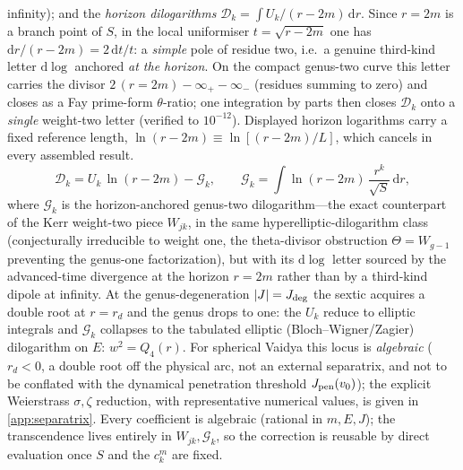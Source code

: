 \documentclass[12pt]{iopart}
\newcommand{\Jpen}{J_{\rm pen}}
\newcommand{\dd}{\mathrm{d}}
\begin{document}
infinity); and
the \emph{horizon dilogarithms} $\mathcal{D}_k=\int U_k/(r-2m)\,\dd r$. Since $r=2m$
is a branch point of $S$, in the local uniformiser $t=\sqrt{r-2m}$ one has
$\dd r/(r-2m)=2\,\dd t/t$: a \emph{simple} pole of residue two, i.e.\ a genuine
third-kind letter $\dd\log$ anchored \emph{at the horizon}. On the compact
genus-two curve this letter carries the divisor $2\,(r{=}2m)-\infty_+-\infty_-$ (residues
summing to zero) and closes as a Fay prime-form $\theta$-ratio; one integration by parts
then closes $\mathcal{D}_k$ onto a \emph{single} weight-two letter (verified to
$10^{-12}$). Displayed horizon logarithms carry a fixed reference length,
$\ln(r-2m)\equiv\ln[(r-2m)/L]$, which cancels in every assembled result.
\begin{equation}
    \mathcal{D}_k=U_k\,\ln(r-2m)-\mathcal{G}_k,\qquad
    \mathcal{G}_k=\int\ln(r-2m)\,\frac{r^k}{\sqrt S}\,\dd r,
    \label{eq:horizon-dilog}
\end{equation}
where $\mathcal{G}_k$ is the horizon-anchored genus-two dilogarithm---the exact
counterpart of the Kerr weight-two piece $W_{jk}$, in the same
hyperelliptic-dilogarithm class (conjecturally irreducible to weight one, the
theta-divisor obstruction $\Theta=W_{g-1}$ preventing the genus-one factorization),
but with its $\dd\log$ letter sourced by the
advanced-time divergence at the horizon $r=2m$ rather than by a third-kind dipole at
infinity. At the genus-degeneration $|J|=J_{\rm deg}$ the sextic acquires a double root at $r=r_d$
and the genus drops to one: the $U_k$ reduce to elliptic integrals and $\mathcal{G}_k$
collapses to the tabulated elliptic (Bloch--Wigner/Zagier) dilogarithm
\cite{Bloch2000,Zagier1990} on $E:\,w^2=Q_4(r)$. For spherical Vaidya this locus is
\emph{algebraic} ($r_d<0$, a double root off the physical arc, not an external
separatrix, and not to be conflated with the dynamical penetration threshold
$\Jpen(v_0)$); the explicit Weierstrass $\sigma,\zeta$ reduction, with representative
numerical values, is given in \ref{app:separatrix}. Every coefficient is algebraic
(rational in $m,E,J$); the transcendence lives entirely in $W_{jk},\mathcal{G}_k$, so the
correction is reusable by direct evaluation once $S$ and the $c_k^m$ are fixed.
\end{document}

